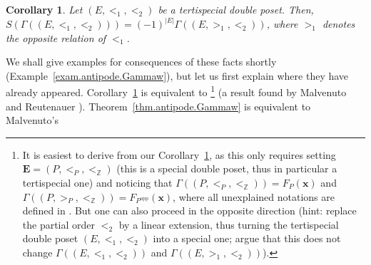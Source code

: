\documentclass[12pt]{article}
\theoremstyle{plain}
\newtheorem{corollary}[theorem]{Corollary}
\theoremstyle{definition}
\theoremstyle{remark}
\newcommand{\xx}{{\mathbf{x}}}
\newcommand{\EE}{{\mathbf{E}}}
\newcommand{\ZZ}{{\mathbb{Z}}}
\begin{document}
\begin{corollary}
\label{cor.antipode.Gamma}
Let $\left(E, <_1, <_2\right)$ be a tertispecial double poset.
Then, $S\left(\Gamma\left(\left(E, <_1, <_2\right)\right)\right)
= \left(-1\right)^{\left|E\right|}
\Gamma\left(\left(E, >_1, <_2\right)\right)$,
where $>_1$ denotes the opposite relation of $<_1$.
\end{corollary}

We shall give examples for consequences of these facts shortly
(Example~\ref{exam.antipode.Gammaw}), but
let us first explain where they have already appeared.
Corollary~\ref{cor.antipode.Gamma} is equivalent to
\cite[Corollary 5.27]{Reiner}\footnote{It is easiest to derive
\cite[Corollary 5.27]{Reiner} from our Corollary~\ref{cor.antipode.Gamma},
as this only requires setting $\EE = \left(P, <_P, <_{\ZZ}\right)$
(this is a special double poset, thus in particular a tertispecial
one) and noticing that
$\Gamma\left(\left(P, <_P, <_{\ZZ}\right)\right)
= F_P\left(\xx\right)$ and
$\Gamma\left(\left(P, >_P, <_{\ZZ}\right)\right)
= F_{P^{\operatorname{opp}}}\left(\xx\right)$, where all unexplained
notations are defined in \cite[Chapter 5]{Reiner}. But one can also
proceed in the opposite direction (hint: replace the partial order
$<_2$ by a linear extension, thus turning the tertispecial double
poset $\left(E, <_1, <_2\right)$ into a special one; argue that
this does not change $\Gamma\left(\left(E, <_1, <_2\right)\right)$
and $\Gamma\left(\left(E, >_1, <_2\right)\right)$).}
(a result found by Malvenuto and Reutenauer
\cite[Lemma 3.2]{Mal-Reu}).
Theorem~\ref{thm.antipode.Gammaw} is equivalent to Malvenuto's
\end{document}
